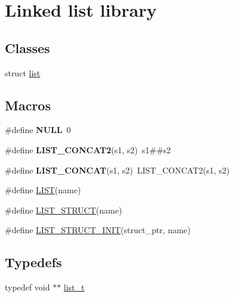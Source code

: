 \hypertarget{group__list}{}\section{Linked list library}
\label{group__list}
\subsection*{Classes}
\begin{DoxyCompactItemize}
\item 
struct \hyperlink{structlist}{list}
\end{DoxyCompactItemize}
\subsection*{Macros}
\begin{DoxyCompactItemize}
\item 
\hypertarget{group__list_ga070d2ce7b6bb7e5c05602aa8c308d0c4}{}\#define {\bfseries N\+U\+L\+L}~0\label{group__list_ga070d2ce7b6bb7e5c05602aa8c308d0c4}

\item 
\hypertarget{group__list_ga904bf2549c4df0942a4a36a5486fbba9}{}\#define {\bfseries L\+I\+S\+T\+\_\+\+C\+O\+N\+C\+A\+T2}(s1,  s2)~s1\#\#s2\label{group__list_ga904bf2549c4df0942a4a36a5486fbba9}

\item 
\hypertarget{group__list_gad8951367826c57390a9f9892e0fc2659}{}\#define {\bfseries L\+I\+S\+T\+\_\+\+C\+O\+N\+C\+A\+T}(s1,  s2)~L\+I\+S\+T\+\_\+\+C\+O\+N\+C\+A\+T2(s1, s2)\label{group__list_gad8951367826c57390a9f9892e0fc2659}

\item 
\#define \hyperlink{group__list_ga1e61a00c396ab8bd4141f54772e310ce}{L\+I\+S\+T}(name)
\item 
\#define \hyperlink{group__list_gab5acb500a887e1957292f3dddc5c9b79}{L\+I\+S\+T\+\_\+\+S\+T\+R\+U\+C\+T}(name)
\item 
\#define \hyperlink{group__list_gadcb86fe4485a0f8ea79541117641f730}{L\+I\+S\+T\+\_\+\+S\+T\+R\+U\+C\+T\+\_\+\+I\+N\+I\+T}(struct\+\_\+ptr,  name)
\end{DoxyCompactItemize}
\subsection*{Typedefs}
\begin{DoxyCompactItemize}
\item 
typedef void $\ast$$\ast$ \hyperlink{group__list_ga9c248916bae1f0b13732686786be7108}{list\+\_\+t}
\end{DoxyCompactItemize}
